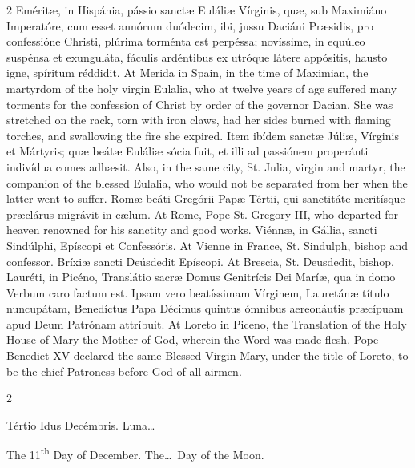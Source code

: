 \begin{paracol}{2}
Eméritæ, in Hispánia, 
 pássio sanctæ Euláliæ Vírginis, quæ, sub Maximiáno Imperatóre, cum esset 
 annórum duódecim, ibi, jussu Daciáni Præsidis, pro confessióne Christi, 
 plúrima torménta est perpéssa; novíssime, in equúleo suspénsa et exunguláta, 
 fáculis ardéntibus ex utróque látere appósitis, hausto igne, spíritum 
 réddidit.
\switchcolumn
{}
At Merida in Spain, in the time of 
 Maximian, the martyrdom of the holy virgin Eulalia, who at twelve years of 
 age suffered many torments for the confession of Christ by order of the 
 governor Dacian. She was stretched on the rack, torn with iron claws, 
 had her sides burned with flaming torches, and swallowing the fire she 
 expired.
\switchcolumn*
{}
Item ibídem sanctæ 
 Júliæ, Vírginis et Mártyris; quæ beátæ Euláliæ sócia fuit, et illi ad 
 passiónem properánti indivídua comes adhæsit.
\switchcolumn
{}
Also, in the same city, St. Julia, 
 virgin and martyr, the companion of the blessed Eulalia, who would not be 
 separated from her when the latter went to suffer.
\switchcolumn*
{}
Romæ beáti Gregórii 
 Papæ Tértii, qui sanctitáte meritísque præclárus migrávit in cælum.
\switchcolumn
{}
At Rome, Pope St. Gregory III, who 
 departed for heaven renowned for his sanctity and good works.
\switchcolumn*
{}
Viénnæ, in Gállia, 
 sancti Sindúlphi, Epíscopi et Confessóris.
\switchcolumn
{}
At Vienne in France, St. Sindulph, 
 bishop and confessor.
\switchcolumn*
{}
Bríxiæ sancti Deúsdedit 
 Epíscopi.
\switchcolumn
{}
At Brescia, St. Deusdedit, bishop.
\switchcolumn*
{}
Lauréti, in Picéno, Translátio sacræ Domus Genitrícis Dei Maríæ, qua in domo Verbum caro factum 
 est. Ipsam vero beatíssimam Vírginem, Lauretánæ título nuncupátam, 
 Benedíctus Papa Décimus quintus ómnibus aereonáutis præcípuam apud Deum 
 Patrónam attríbuit.
\switchcolumn
{}
At Loreto in Piceno, the 
 Translation of the Holy House of Mary the Mother of God, wherein the Word 
 was made flesh. Pope Benedict XV declared the same Blessed Virgin 
 Mary, under the title of Loreto, to be the chief Patroness before God of 
 all airmen.
\switchcolumn*
{}
\end{paracol}


\begin{paracol}{2}
\begin{center}{\color{gregoriocolor} Tértio Idus Decémbris. 
 Luna\dots\ }\end{center}
\switchcolumn
{}
\begin{center}{\color{gregoriocolor} The 
 11\textsuperscript{th} Day of 
 December. The\dots\ Day of the Moon.}\end{center}
\end{paracol}

